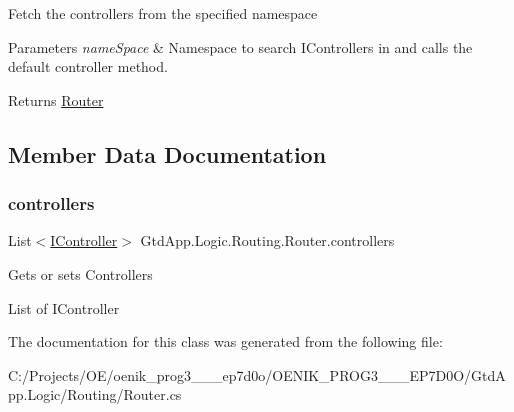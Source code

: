 Fetch the controllers from the specified namespace 


\begin{DoxyParams}{Parameters}
{\em name\+Space} & Namespace to search I\+Controllers in and calls the default controller method.\\
\hline
\end{DoxyParams}
\begin{DoxyReturn}{Returns}
\mbox{\hyperlink{class_gtd_app_1_1_logic_1_1_routing_1_1_router}{Router}}
\end{DoxyReturn}


\subsection{Member Data Documentation}
\mbox{\label{class_gtd_app_1_1_logic_1_1_routing_1_1_router_ae44dda68d6febb0af417a68bae08956e}} 
\subsubsection{\texorpdfstring{controllers}{controllers}}
{\footnotesize\ttfamily List$<$\mbox{\hyperlink{interface_gtd_app_1_1_logic_1_1_interfaces_1_1_i_controller}{I\+Controller}}$>$ Gtd\+App.\+Logic.\+Routing.\+Router.\+controllers\hspace{0.3cm}{\ttfamily [private]}}



Gets or sets Controllers 

List of I\+Controller

The documentation for this class was generated from the following file\+:\begin{DoxyCompactItemize}
\item 
C\+:/\+Projects/\+O\+E/oenik\+\_\+prog3\+\_\+\_\+\_\+ep7d0o/\+O\+E\+N\+I\+K\+\_\+\+P\+R\+O\+G3\+\_\+\_\+\_\+\+E\+P7\+D0\+O/\+Gtd\+App.\+Logic/\+Routing/Router.\+cs\end{DoxyCompactItemize}
